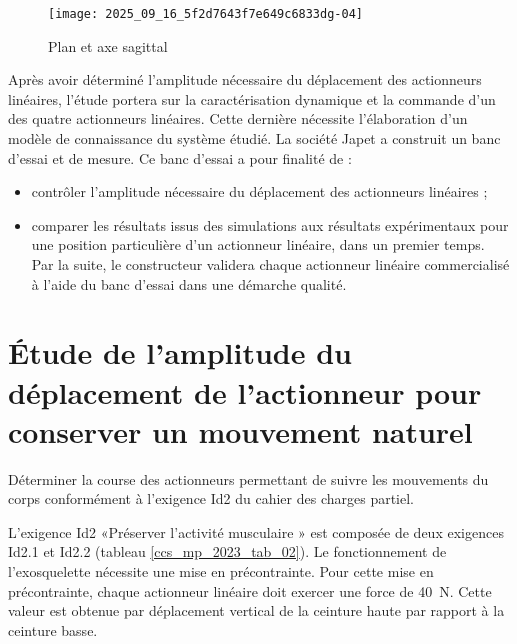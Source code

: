 
\begin{figure}[!h]
\centering
\texttt{[image: 2025\_09\_16\_5f2d7643f7e649c6833dg-04]}
\caption{\label{ccs_mp_2023_fig_05}  Plan et axe sagittal}
\end{figure}


Après avoir déterminé l'amplitude nécessaire du déplacement des actionneurs linéaires, l'étude portera sur la caractérisation dynamique et la commande d'un des quatre actionneurs linéaires. Cette dernière nécessite l'élaboration d'un modèle de connaissance du système étudié. La société Japet a construit un banc d'essai et de mesure. Ce banc d'essai a pour finalité de :

\begin{itemize}
  \item contrôler l'amplitude nécessaire du déplacement des actionneurs linéaires ;
  \item comparer les résultats issus des simulations aux résultats expérimentaux pour une position particulière d'un actionneur linéaire, dans un premier temps.\\
Par la suite, le constructeur validera chaque actionneur linéaire commercialisé à l'aide du banc d'essai dans une démarche qualité.
\end{itemize}

\section{Étude de l'amplitude du déplacement de l'actionneur pour conserver un mouvement naturel} %
\begin{obj}
Déterminer la course des actionneurs permettant de suivre les mouvements du corps conformément à l'exigence Id2 du cahier des charges partiel.
\end{obj}


L'exigence Id2 «Préserver l'activité musculaire » est composée de deux exigences Id2.1 et Id2.2 (tableau \ref{ccs_mp_2023_tab_02}). Le fonctionnement de l'exosquelette nécessite une mise en précontrainte. Pour cette mise en précontrainte, chaque actionneur linéaire doit exercer une force de \SI{40}{N}. Cette valeur est obtenue par déplacement vertical de la ceinture haute par rapport à la ceinture basse.

